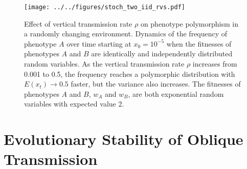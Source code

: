 \documentclass[9pt,twocolumn,twoside,lineno]{pnas-new}
\begin{document}
\begin{figure}[h]
\centering
\texttt{[image: ../../figures/stoch\_two\_iid\_rvs.pdf]}
\caption{Effect of vertical transmission rate $\rho$ on phenotype polymorphism in a randomly changing environment. Dynamics of the frequency of phenotype \(A\) over time starting at \(x_0=10^{-5}\) when the fitnesses of phenotypes \(A\) and \(B\) are identically and independently distributed random variables.
As the vertical transmission rate \(\rho\) increases from 0.001 to 0.5, the frequency reaches a polymorphic distribution with \(E(x_t)\to0.5\) faster,
but the variance also increases.
The fitnesses of phenotypes \(A\) and \(B\), \(w_A\) and \(w_B\), are both exponential random variables with expected value 2.}\label{fig:stoch_two_iid_rvs}
\end{figure}

\section{Evolutionary Stability of Oblique Transmission}
 
\end{document}
